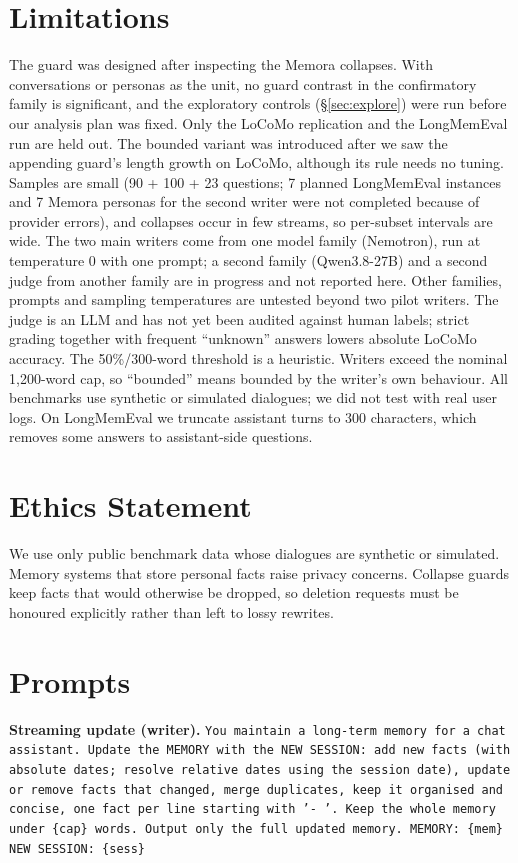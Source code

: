 \documentclass[11pt]{article}
\begin{document}
\section*{Limitations}
The guard was designed after inspecting the Memora collapses. With conversations or personas as the unit, no guard contrast in the confirmatory family is significant, and the exploratory controls (\S\ref{sec:explore}) were run before our analysis plan was fixed. Only the LoCoMo replication and the LongMemEval run are held out. The bounded variant was introduced after we saw the appending guard's length growth on LoCoMo, although its rule needs no tuning. Samples are small (90 + 100 + 23 questions; 7 planned LongMemEval instances and 7 Memora personas for the second writer were not completed because of provider errors), and collapses occur in few streams, so per-subset intervals are wide. The two main writers come from one model family (Nemotron), run at temperature 0 with one prompt; a second family (Qwen3.8-27B) and a second judge from another family are in progress and not reported here. Other families, prompts and sampling temperatures are untested beyond two pilot writers. The judge is an LLM and has not yet been audited against human labels; strict grading together with frequent ``unknown'' answers lowers absolute LoCoMo accuracy. The 50\%/300-word threshold is a heuristic. Writers exceed the nominal 1,200-word cap, so ``bounded'' means bounded by the writer's own behaviour. All benchmarks use synthetic or simulated dialogues; we did not test with real user logs. On LongMemEval we truncate assistant turns to 300 characters, which removes some answers to assistant-side questions.

\section*{Ethics Statement}
We use only public benchmark data whose dialogues are synthetic or simulated. Memory systems that store personal facts raise privacy concerns. Collapse guards keep facts that would otherwise be dropped, so deletion requests must be honoured explicitly rather than left to lossy rewrites.



\appendix
\section{Prompts}\label{app:prompts}
\small
\textbf{Streaming update (writer).} \texttt{You maintain a long-term memory for a chat assistant. Update the MEMORY with the NEW SESSION: add new facts (with absolute dates; resolve relative dates using the session date), update or remove facts that changed, merge duplicates, keep it organised and concise, one fact per line starting with '- '. Keep the whole memory under \{cap\} words. Output only the full updated memory. MEMORY: \{mem\} NEW SESSION: \{sess\}}
\end{document}
